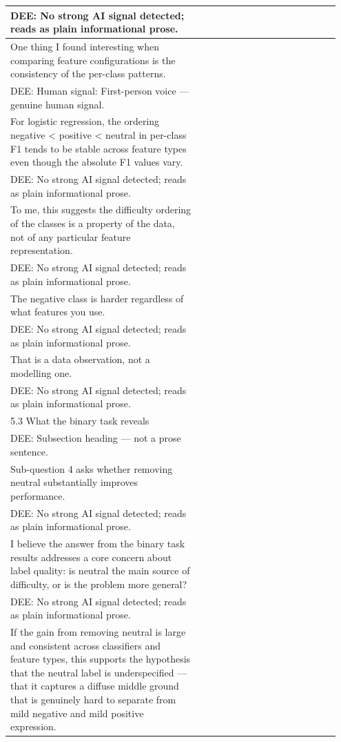 \documentclass[11pt]{article}
\begin{document}
\begin{longtable}{|p{0.55\linewidth}|p{0.40\linewidth}|}
\hline
DEE: No strong AI signal detected; reads as plain informational prose. & \\
\hline
One thing I found interesting when comparing feature configurations is the consistency of the per-class patterns. & \\[2pt]
\hline
DEE: Human signal: First-person voice --- genuine human signal. & \\
\hline
For logistic regression, the ordering negative < positive < neutral in per-class F1 tends to be stable across feature types even though the absolute F1 values vary. & \\[2pt]
\hline
DEE: No strong AI signal detected; reads as plain informational prose. & \\
\hline
To me, this suggests the difficulty ordering of the classes is a property of the data, not of any particular feature representation. & \\[2pt]
\hline
DEE: No strong AI signal detected; reads as plain informational prose. & \\
\hline
The negative class is harder regardless of what features you use. & \\[2pt]
\hline
DEE: No strong AI signal detected; reads as plain informational prose. & \\
\hline
That is a data observation, not a modelling one. & \\[2pt]
\hline
DEE: No strong AI signal detected; reads as plain informational prose. & \\
\hline
5.3 What the binary task reveals & \\[2pt]
\hline
DEE: Subsection heading --- not a prose sentence. & \\
\hline
Sub-question 4 asks whether removing neutral substantially improves performance. & \\[2pt]
\hline
DEE: No strong AI signal detected; reads as plain informational prose. & \\
\hline
I believe the answer from the binary task results addresses a core concern about label quality: is neutral the main source of difficulty, or is the problem more general? & \\[2pt]
\hline
DEE: No strong AI signal detected; reads as plain informational prose. & \\
\hline
If the gain from removing neutral is large and consistent across classifiers and feature types, this supports the hypothesis that the neutral label is underspecified --- that it captures a diffuse middle ground that is genuinely hard to separate from mild negative and mild positive expression. & \\[2pt]

\end{longtable}
\end{document}
